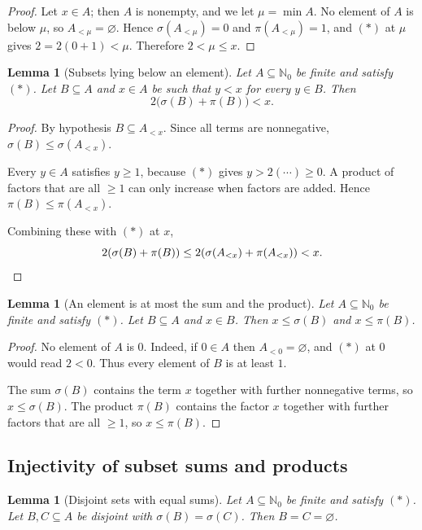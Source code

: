 \documentclass[11pt]{article}
\newtheorem{lemma}[theorem]{Lemma}
\theoremstyle{definition}
\theoremstyle{remark}
\newcommand{\Nz}{\mathbb{N}_0}
\begin{document}
\begin{proof}
Let $x\in A$; then $A$ is nonempty, and we let $\mu=\min A$. No element of $A$ is below $\mu$, so $A_{<\mu}=\varnothing$. Hence $\sigma(A_{<\mu})=0$ and $\pi(A_{<\mu})=1$, and $(\ast)$ at $\mu$ gives $2=2(0+1)<\mu$. Therefore $2<\mu\le x$.
\end{proof}

\begin{lemma}[Subsets lying below an element]\label{lem:hfs_below}
Let $A\subseteq\Nz$ be finite and satisfy $(\ast)$. Let $B\subseteq A$ and $x\in A$ be such that $y<x$ for every $y\in B$. Then
\[
2\bigl(\sigma(B)+\pi(B)\bigr)<x.
\]
\end{lemma}

\begin{proof}
By hypothesis $B\subseteq A_{<x}$. Since all terms are nonnegative, $\sigma(B)\le\sigma(A_{<x})$.

Every $y\in A$ satisfies $y\ge1$, because $(\ast)$ gives $y>2(\cdots)\ge0$. A product of factors that are all $\ge1$ can only increase when factors are added. Hence $\pi(B)\le\pi(A_{<x})$.

Combining these with $(\ast)$ at $x$,
\[
2(\sigma(B)+\pi(B))\le2(\sigma(A_{<x})+\pi(A_{<x}))<x. \qedhere
\]
\end{proof}

\begin{lemma}[An element is at most the sum and the product]\label{lem:hfs_le_mem}
Let $A\subseteq\Nz$ be finite and satisfy $(\ast)$. Let $B\subseteq A$ and $x\in B$. Then $x\le\sigma(B)$ and $x\le\pi(B)$.
\end{lemma}

\begin{proof}
No element of $A$ is $0$. Indeed, if $0\in A$ then $A_{<0}=\varnothing$, and $(\ast)$ at $0$ would read $2<0$. Thus every element of $B$ is at least $1$.

The sum $\sigma(B)$ contains the term $x$ together with further nonnegative terms, so $x\le\sigma(B)$. The product $\pi(B)$ contains the factor $x$ together with further factors that are all $\ge1$, so $x\le\pi(B)$.
\end{proof}

\subsection{Injectivity of subset sums and products}

\begin{lemma}[Disjoint sets with equal sums]\label{lem:hfs_disj_sum}
Let $A\subseteq\Nz$ be finite and satisfy $(\ast)$. Let $B,C\subseteq A$ be disjoint with $\sigma(B)=\sigma(C)$. Then $B=C=\varnothing$.
\end{lemma}
\end{document}
